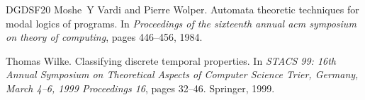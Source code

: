 \documentclass[10pt,a4paper]{amsart}
\theoremstyle{plain}
\theoremstyle{definition}
\theoremstyle{definition}
\DeclareMathOperator{\?}{?}
\begin{document}
\begin{thebibliography}{DGDSF{\etalchar{+}}20}
Moshe~Y Vardi and Pierre Wolper.
\newblock Automata theoretic techniques for modal logics of programs.
\newblock In {\em Proceedings of the sixteenth annual acm symposium on theory of computing}, pages 446--456, 1984.

Thomas Wilke.
\newblock Classifying discrete temporal properties.
\newblock In {\em STACS 99: 16th Annual Symposium on Theoretical Aspects of Computer Science Trier, Germany, March 4--6, 1999 Proceedings 16}, pages 32--46. Springer, 1999.

\end{thebibliography}
\end{document}
